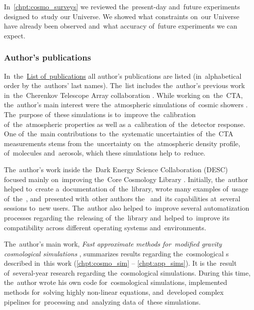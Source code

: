 In~\autoref{chpt:cosmo_surveys} we reviewed the~present-day and~future experiments designed to~study our Universe. We showed what constraints on~our Universe have already been observed and~what accuracy of~future experiments we can expect.

\subsubsection{Author's publications}
\begin{refsection}
In~the~\hyperref[chpt:list_publish]{List of~publications} all author's publications are listed (in~alphabetical order by the~authors' last names). The~list includes the~author's previous work in~the~Cherenkov Telescope Array collaboration \parencite{2016arXiv161005151C,2017arXiv170903483A,2017ApJ...840...74A,2019scta.book.....C}. While working on~the~CTA, the~author's main interest were the~atmospheric simulations of~cosmic showers \parencite{2017EPJWC.14401014V,}. The~purpose of~these simulations is to~improve the~calibration of~the~atmospheric properties as well as a~calibration of~the~detector response. One of~the~main contributions to~the~systematic uncertainties of~the~CTA measurements stems from the~uncertainty on~the~atmospheric density profile, of~molecules and~aerosols, which these simulations help to~reduce.

The~author's work inside the~Dark Energy Science Collaboration (DESC) focused mainly on~improving the~Core Cosmology Library \parencite[,][]{2019ascl.soft01003C,2019ApJS..242....2C}. Initially, the~author helped to~create a~documentation of~the~library, wrote many examples of~usage of~the~, and~presented with~other authors the~ and~its capabilities at~several sessions to~new users. The~author also helped to~improve several automatization processes regarding the~releasing of~the~library and~helped to~improve its compatibility across different operating systems and~environments.

The~author's main work, \textit{Fast approximate methods for~modified gravity cosmological simulations} \parencite[published in~Monthly Notices of~the~Royal Astronomical Society,][]{2020MNRAS.493.2085V}, summarizes results regarding the~cosmological \nbodysim s described in~this work (\autoref{chpt:cosmo_sim} -- \autoref{chpt:app_sims}). It is the~result of~several-year research regarding the~cosmological simulations. During this time, the~author wrote his own code for~cosmological simulations, implemented methods for~solving highly non-linear equations, and~developed complex pipelines for~processing and~analyzing data of~these simulations.
\end{refsection}
\clearpage{}


